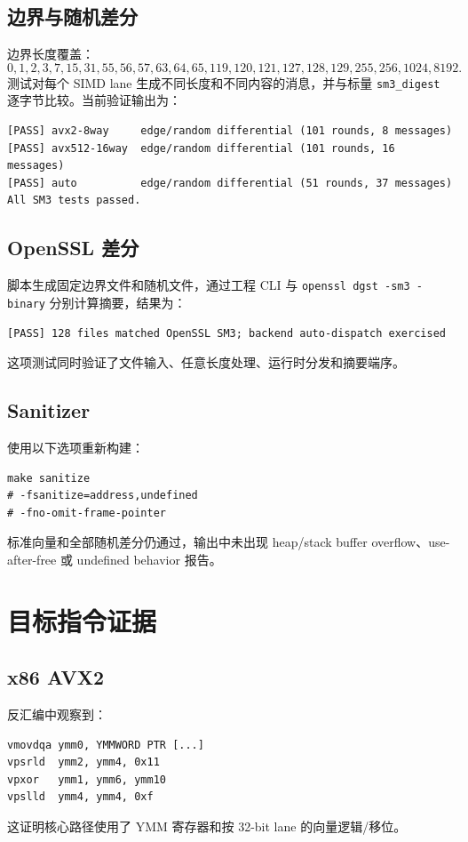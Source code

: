 \documentclass[UTF8,a4paper,12pt]{ctexart}
\newcommand{\code}[1]{\texttt{#1}}
\begin{document}
\subsection{边界与随机差分}
边界长度覆盖：
\begin{equation*}
0,1,2,3,7,15,31,55,56,57,63,64,65,119,120,121,127,128,129,255,256,1024,8192.
\end{equation*}
测试对每个 SIMD lane 生成不同长度和不同内容的消息，并与标量 \code{sm3\_digest} 逐字节比较。当前验证输出为：
\begin{verbatim}
[PASS] avx2-8way     edge/random differential (101 rounds, 8 messages)
[PASS] avx512-16way  edge/random differential (101 rounds, 16 messages)
[PASS] auto          edge/random differential (51 rounds, 37 messages)
All SM3 tests passed.
\end{verbatim}

\subsection{OpenSSL 差分}
脚本生成固定边界文件和随机文件，通过工程 CLI 与 \code{openssl dgst -sm3 -binary} 分别计算摘要，结果为：
\begin{verbatim}
[PASS] 128 files matched OpenSSL SM3; backend auto-dispatch exercised
\end{verbatim}
这项测试同时验证了文件输入、任意长度处理、运行时分发和摘要端序。

\subsection{Sanitizer}
使用以下选项重新构建：
\begin{lstlisting}[style=shellstyle,caption={ASan/UBSan 验证命令}]
make sanitize
# -fsanitize=address,undefined
# -fno-omit-frame-pointer
\end{lstlisting}
标准向量和全部随机差分仍通过，输出中未出现 heap/stack buffer overflow、use-after-free 或 undefined behavior 报告。

\section{目标指令证据}

\subsection{x86 AVX2}
反汇编中观察到：
\begin{verbatim}
vmovdqa ymm0, YMMWORD PTR [...]
vpsrld  ymm2, ymm4, 0x11
vpxor   ymm1, ymm6, ymm10
vpslld  ymm4, ymm4, 0xf
\end{verbatim}
这证明核心路径使用了 YMM 寄存器和按 32-bit lane 的向量逻辑/移位。
\end{document}
